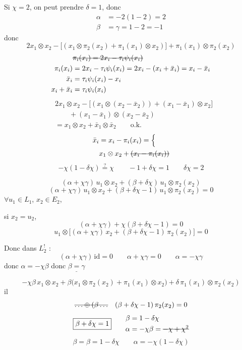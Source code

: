 \documentclass[11pt,a4paper]{article}
\begin{document}
Si $\chi=2$, on peut prendre $\delta=1$, donc
\begin{align*}
\alpha&=-2(1-2)=2\\
\beta&=\gamma=1-2=-1
\end{align*}
donc
\[
2x_1\otimes x_2-\bigl[(x_1\otimes\pi_2(x_2)+\pi_1(x_1)\otimes x_2)\bigr]+\pi_1(x_1)\otimes\pi_2(x_2)
\]
\begin{align*}
&\text{\struck{$\pi_i(x_i)=2x_i-\tau_i\psi_i(x_i)$}}\\
\pi_i(x_i)&=2x_i-\tau_i\psi_i(x_i)=2x_i-(x_i+\bar x_i)=x_i-\bar x_i\\
\bar x_i&=\tau_i\psi_i(x_i)-x_i\\
x_i+\bar x_i&=\tau_i\psi_i(x_i)
\end{align*}
\begin{align*}
&2x_1\otimes x_2-\bigl[(x_1\otimes(x_2-\bar x_2))+(x_1-\bar x_1)\otimes x_2\bigr]\\
&\qquad+(x_1-\bar x_1)\otimes(x_2-\bar x_2)\\
&=x_1\otimes x_2+\bar x_1\otimes\bar x_2 \qquad\text{o.k.}
\end{align*}
\begin{align*}
\bar x_i&=x_i-\pi_i(x_i)=\Bigl\{\\
&x_1\otimes x_2+\text{\struck{$(x_i-\pi_i(x_i))$}}
\end{align*}
\[
-\chi(1-\delta\chi)\overset{?}{=}\chi\qquad -1+\delta\chi=1\qquad \boxed{\delta\chi=2}
\]

\quad\struck{$\alpha\,\ill{}+\chi\gamma$}
\[
(\alpha+\chi\gamma)\,u_1\otimes x_2+(\beta+\delta\chi)\,u_1\otimes\pi_2(x_2)
\]
\[
(\alpha+\chi\gamma)\,u_1\otimes x_2+(\beta+\delta\chi-1)\,u_1\otimes\pi_2(x_2)=0
\]
$\forall u_1\in L_1$, $x_2\in E_2$,

si $x_2=u_2$,  
\[
(\alpha+\chi\gamma)+\chi(\beta+\delta\chi-1)=0
\]
\[
u_1\otimes\bigl[(\alpha+\chi\gamma)\,x_2+(\beta+\delta\chi-1)\,\pi_2(x_2)\bigr]=0
\]

Donc dans $L^{!}_2$   :
\[
(\alpha+\chi\gamma)\,\mathrm{id}=0
\qquad
\alpha+\chi\gamma=0
\qquad
\alpha=-\chi\gamma
\]
donc \ill{} $\alpha=-\chi\beta$ \quad donc $\underline{\beta=\gamma}$

\struck{$\beta+\delta$}
\[
-\chi\beta\,x_1\otimes x_2+\beta\bigl(x_1\otimes\pi_2(x_2)+\pi_1(x_1)\otimes x_2\bigr)+\delta\,\pi_1(x_1)\otimes\pi_2(x_2)
\]
il   \struck{\ill{}}
\[
\text{\struck{$\ldots\oplus(\beta\ldots$}}\quad(\beta+\delta\chi-1)\,\pi_2(x_2)=0
\]
\[
\boxed{\beta+\delta\chi=1}
\qquad
\begin{aligned}
\beta&=1-\delta\chi\\
\alpha&=-\chi\beta=\text{\struck{$-\chi+\chi^2$}}
\end{aligned}
\]
\[
\beta=\beta=1-\delta\chi\qquad \alpha=-\chi(1-\delta\chi)
\]
\end{document}
